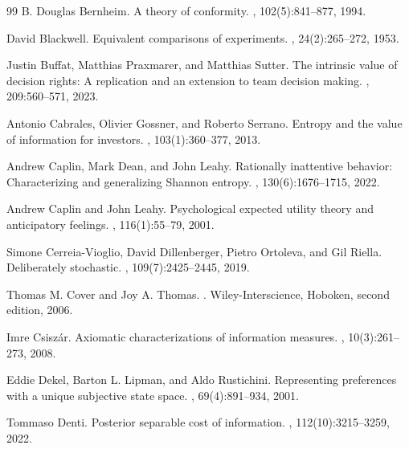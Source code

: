 \documentclass[11pt,a4paper]{article}
\theoremstyle{definition}
\newcommand{\1}{\mathbf 1}
\begin{document}
\begin{thebibliography}{99}
B. Douglas Bernheim.
\newblock A theory of conformity.
, 102(5):841--877, 1994.

David Blackwell.
\newblock Equivalent comparisons of experiments.
, 24(2):265--272, 1953.

Justin Buffat, Matthias Praxmarer, and Matthias Sutter.
\newblock The intrinsic value of decision rights: A replication and an extension to team decision making.
, 209:560--571, 2023.

Antonio Cabrales, Olivier Gossner, and Roberto Serrano.
\newblock Entropy and the value of information for investors.
, 103(1):360--377, 2013.

Andrew Caplin, Mark Dean, and John Leahy.
\newblock Rationally inattentive behavior: Characterizing and generalizing {S}hannon entropy.
, 130(6):1676--1715, 2022.

Andrew Caplin and John Leahy.
\newblock Psychological expected utility theory and anticipatory feelings.
, 116(1):55--79, 2001.

Simone Cerreia-Vioglio, David Dillenberger, Pietro Ortoleva, and Gil Riella.
\newblock Deliberately stochastic.
, 109(7):2425--2445, 2019.

Thomas M. Cover and Joy A. Thomas.
.
\newblock Wiley-Interscience, Hoboken, second edition, 2006.

Imre Csisz\'ar.
\newblock Axiomatic characterizations of information measures.
, 10(3):261--273, 2008.

Eddie Dekel, Barton L. Lipman, and Aldo Rustichini.
\newblock Representing preferences with a unique subjective state space.
, 69(4):891--934, 2001.

Tommaso Denti.
\newblock Posterior separable cost of information.
, 112(10):3215--3259, 2022.


\end{thebibliography}
\end{document}
